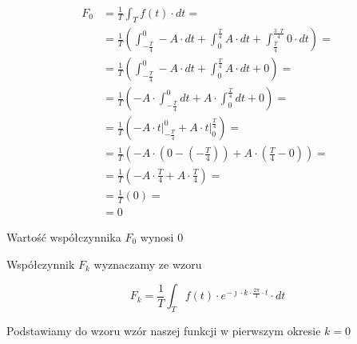 \begin{task}
\begin{equation}
\begin{aligned}
F_0 &=\frac{1}{T}\int_{T}f(t) \cdot dt =\\
&=\frac{1}{T} \left( \int_{-\frac{T}{4}}^{0} -A \cdot dt + 
\int_{0}^{\frac{T}{4}} A \cdot dt +
\int_{\frac{T}{4}}^{\frac{3\cdot T}{4}} 0 \cdot dt \right ) = \\
&=\frac{1}{T} \left( \int_{-\frac{T}{4}}^{0} -A \cdot dt + 
\int_{0}^{\frac{T}{4}} A \cdot dt + 0 \right ) = \\
&=\frac{1}{T} \left( -A \cdot \int_{-\frac{T}{4}}^{0} dt + 
A \cdot \int_{0}^{\frac{T}{4}} dt + 0 \right ) = \\
&=\frac{1}{T} \left( -A \cdot \left. t \right|_{-\frac{T}{4}}^{0} + 
A \cdot \left. t \right|_{0}^{\frac{T}{4}}\right ) = \\
&=\frac{1}{T} \left( -A \cdot \left( 0 - \left(-\frac{T}{4}\right) \right) + 
A \cdot \left( \frac{T}{4} - 0 \right)\right ) = \\
&=\frac{1}{T} \left( -A \cdot \frac{T}{4} + 
A \cdot \frac{T}{4}\right ) = \\
&=\frac{1}{T} \left( 0 \right ) = \\
&=0
\end{aligned}
\end{equation}

Wartość współczynnika $F_0$ wynosi $0$


Współczynnik $F_k$ wyznaczamy ze wzoru

\begin{equation}
F_k=\frac{1}{T}\int_{T}f(t) \cdot e^{-\jmath \cdot  k \cdot \frac{2\pi}{T} \cdot t} \cdot dt
\end{equation}

Podstawiamy do wzoru wzór naszej funkcji w pierwszym okresie $k=0$


\end{task}

